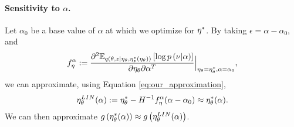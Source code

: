 \paragraph{Sensitivity to $\alpha$.}
%
Let $\alpha_0$ be a base value of $\alpha$ at which we optimize for
$\eta^{*}$. By taking $\epsilon = \alpha - \alpha_0$, and
%
\begin{align*}
f^\alpha_\eta := \frac{\partial^2
    \mathbb{E}_{q\left(\theta, z \vert \eta_\theta, \eta_z^{*}(\eta_\theta)\right)}
        \left[ \log p\left(\nu \vert \alpha \right) \right]}
{ \partial \eta_\theta \partial \alpha^T }
    \Big\rvert_{\eta_\theta = \eta_\theta^{*}, \alpha = \alpha_0},
\end{align*}
%
we can approximate, using Equation \ref{eq:our_approximation},
%
\begin{align*}
\eta_\theta^{LIN}(\alpha) := \eta_\theta^{*} -
  H^{-1} f^\alpha_\eta (\alpha - \alpha_0) \approx \eta_\theta^{*}(\alpha).
\end{align*}
%
We can then approximate
$g\left(\eta_\theta^{*}(\alpha)\right) \approx g\left(\eta_\theta^{LIN}(\alpha)\right)$.
